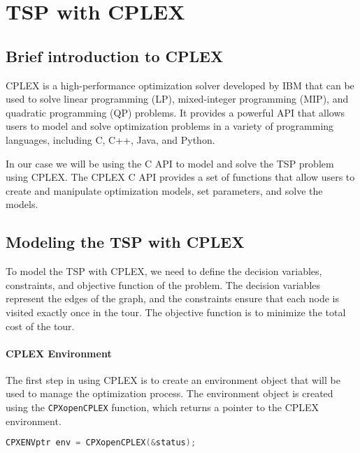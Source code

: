 \documentclass{article}
\begin{document}
\newpage
\section{TSP with CPLEX}

\subsection{Brief introduction to CPLEX}
CPLEX is a high-performance optimization solver developed by IBM that can be used to solve linear programming (LP), mixed-integer programming (MIP), and quadratic programming (QP) problems.
It provides a powerful API that allows users to model and solve optimization problems in a variety of programming languages, including C, C++, Java, and Python.

In our case we will be using the C API to model and solve the TSP problem using CPLEX. The CPLEX C API provides a set of functions that allow users to create and manipulate optimization models, 
set parameters, and solve the models.

\subsection{Modeling the TSP with CPLEX}
To model the TSP with CPLEX, we need to define the decision variables, constraints, and objective function of the problem. 
The decision variables represent the edges of the graph, and the constraints ensure that each node is visited exactly once in the tour.
The objective function is to minimize the total cost of the tour.

\paragraph{CPLEX Environment}
The first step in using CPLEX is to create an environment object that will be used to manage the optimization process.
The environment object is created using the \texttt{CPXopenCPLEX} function, which returns a pointer to the CPLEX environment.

\begin{lstlisting}[language=C]
	CPXENVptr env = CPXopenCPLEX(&status);
\end{lstlisting}
\end{document}
